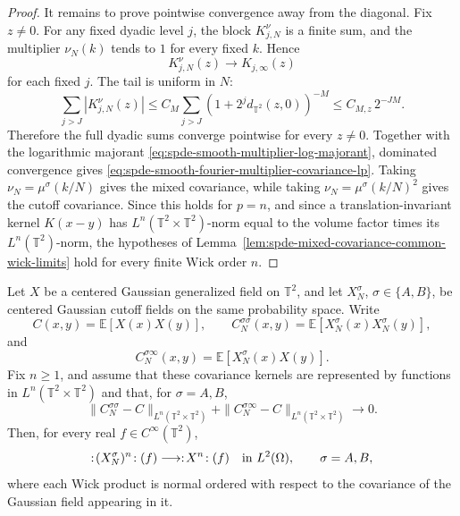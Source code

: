 \begin{proof}
It remains to prove pointwise convergence away from the diagonal.  Fix
\(z\neq0\).  For any fixed dyadic level \(j\), the block
\(K_{j,N}^{\nu}\) is a finite sum, and the multiplier
\(\nu_N(k)\) tends to \(1\) for every fixed \(k\).  Hence
\[
  K_{j,N}^{\nu}(z)\longrightarrow K_{j,\infty}(z)
\]
for each fixed \(j\).  The tail is uniform in \(N\):
\[
  \sum_{j>J}|K_{j,N}^{\nu}(z)|
  \leq
  C_M\sum_{j>J}(1+2^jd_{\mathbb T^2}(z,0))^{-M}
  \leq
  C_{M,z}\,2^{-JM}.
\]
Therefore the full dyadic sums converge pointwise for every \(z\neq0\).
Together with the logarithmic majorant
\eqref{eq:spde-smooth-multiplier-log-majorant}, dominated convergence gives
\eqref{eq:spde-smooth-fourier-multiplier-covariance-lp}.  Taking
\(\nu_N=\mu^\sigma(k/N)\) gives the mixed covariance, while taking
\(\nu_N=\mu^\sigma(k/N)^2\) gives the cutoff covariance.  Since this holds
for \(p=n\), and since a translation-invariant kernel \(K(x-y)\) has
\(L^n(\mathbb T^2\times\mathbb T^2)\)-norm equal to the volume factor times
its \(L^n(\mathbb T^2)\)-norm, the hypotheses of
Lemma~\ref{lem:spde-mixed-covariance-common-wick-limits} hold for
every finite Wick order \(n\).
\end{proof}

\begin{lemma}
\label{lem:spde-mixed-covariance-common-wick-limits}
Let \(X\) be a centered Gaussian generalized field on \(\mathbb T^2\), and
let \(X_N^\sigma\), \(\sigma\in\{A,B\}\), be centered Gaussian cutoff fields
on the same probability space.  Write
\[
  C(x,y)=\mathbb E[X(x)X(y)],
  \qquad
  C_N^{\sigma\sigma}(x,y)
  =
  \mathbb E[X_N^\sigma(x)X_N^\sigma(y)],
\]
and
\[
  C_N^{\sigma\infty}(x,y)
  =
  \mathbb E[X_N^\sigma(x)X(y)] .
\]
Fix \(n\geq1\), and assume that these covariance kernels are represented by
functions in \(L^n(\mathbb T^2\times\mathbb T^2)\) and that, for
\(\sigma=A,B\),
\begin{equation}
  \|C_N^{\sigma\sigma}-C\|_{L^n(\mathbb T^2\times\mathbb T^2)}
  +
  \|C_N^{\sigma\infty}-C\|_{L^n(\mathbb T^2\times\mathbb T^2)}
  \longrightarrow0 .
  \label{eq:spde-mixed-covariance-common-wick-limits}
\end{equation}
Then, for every real \(f\in C^\infty(\mathbb T^2)\),
\begin{equation}
  :\!(X_N^\sigma)^n\!:(f)
  \longrightarrow
  :\!X^n\!:(f)
  \quad\hbox{in }L^2(\Omega),
  \qquad \sigma=A,B,
  \label{eq:spde-mixed-covariance-wick-coordinate-convergence}
\end{equation}
where each Wick product is normal ordered with respect to the covariance of
the Gaussian field appearing in it.
\end{lemma}

